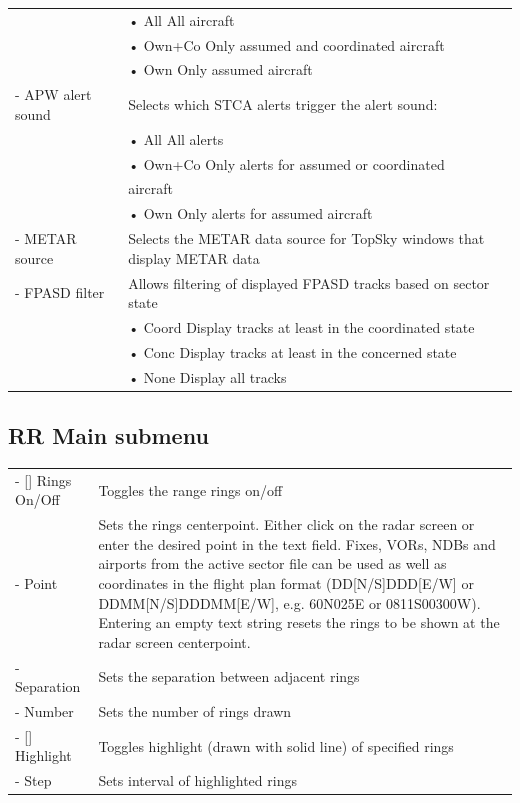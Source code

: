 \documentclass[11pt,a4paper]{memoir}
\begin{document}
\begin{tabular}{p{5cm} p{9cm}}
                          & \hspace{10pt}• All All aircraft\\
                          & \hspace{10pt}• Own+Co Only assumed and coordinated aircraft\\
                          & \hspace{10pt}• Own Only assumed aircraft\\
- APW alert sound         & Selects which STCA alerts trigger the alert sound:\\
                          & \hspace{10pt}• All All alerts\\
                          & \hspace{10pt}• Own+Co Only alerts for assumed or coordinated\\
                          & aircraft\\
                          & \hspace{10pt}• Own Only alerts for assumed aircraft\\
- METAR source            & Selects the METAR data source for TopSky windows that display METAR data\\
- FPASD filter            & Allows filtering of displayed FPASD tracks based on sector state\\
                          & \hspace{10pt}• Coord Display tracks at least in the coordinated state\\
                          & \hspace{10pt}• Conc Display tracks at least in the concerned state\\
                          & \hspace{10pt}• None Display all tracks\\
\end{tabular}
\medskip

\subsection*{RR Main submenu}
\label{menu:rr}
\begin{tabular}{l l}
    - [] Rings On/Off & Toggles the range rings on/off\\
    - Point & Sets the rings centerpoint. Either click on the radar screen or enter the desired point in the text field. Fixes, VORs, NDBs and airports from the active sector file can be used as well as coordinates in the flight plan format (DD[N/S]DDD[E/W] or DDMM[N/S]DDDMM[E/W], e.g. 60N025E or 0811S00300W). Entering an empty text string resets the rings to be shown at the radar screen centerpoint.\\
    - Separation & Sets the separation between adjacent rings\\
    - Number & Sets the number of rings drawn\\
    - [] Highlight & Toggles highlight (drawn with solid line) of specified rings\\
    - Step & Sets interval of highlighted rings\\
\end{tabular}
\end{document}
